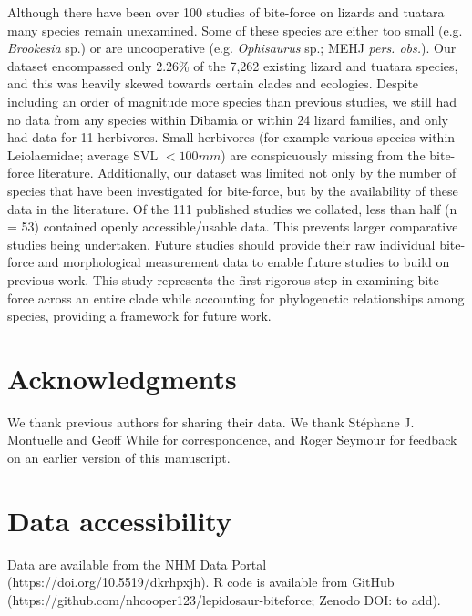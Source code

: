 \documentclass[a4paper, 12pt]{article}
\begin{document}
Although there have been over 100 studies of bite-force on lizards and tuatara \cite{lappin2014reliable} many species remain unexamined. 
Some of these species are either too small (e.g. \textit{Brookesia} sp.) or are uncooperative (e.g. \textit{Ophisaurus} sp.; MEHJ \textit{pers. obs.}). 
Our dataset encompassed only 2.26\% of the 7,262 existing lizard and tuatara species\cite{uetz2020reptile}, and this was heavily skewed towards certain clades and ecologies. 
Despite including an order of magnitude more species than previous studies, we still had no data from any species within Dibamia or within 24 lizard families, and only had data for 11 herbivores. 
Small herbivores (for example various species within Leiolaemidae; average SVL $< 100 mm$\cite{espinoza2004recurrent}) are conspicuously missing from the bite-force literature. 
Additionally, our dataset was limited not only by the number of species that have been investigated for bite-force, but by the availability of these data in the literature. Of the 111 published studies we collated, less than half (n = 53) contained openly accessible/usable data. 
This prevents larger comparative studies being undertaken. Future studies should provide their raw individual bite-force and morphological measurement data to enable future studies to build on previous work. 
This study represents the first rigorous step in examining bite-force across an entire clade while accounting for phylogenetic relationships among species, providing a framework for future work. 


\section{Acknowledgments}
We thank previous authors for sharing their data. We thank  St\'ephane J. Montuelle and Geoff While for correspondence, and Roger Seymour for feedback on an earlier version of this manuscript.


\section{Data accessibility}\label{data-code-and-materials}
Data are available from the NHM Data Portal (https://doi.org/10.5519/dkrhpxjh\cite{lepidosaurdata}). 
R code is available from GitHub (https://github.com/nhcooper123/lepidosaur-biteforce; Zenodo DOI: to add).
\end{document}
